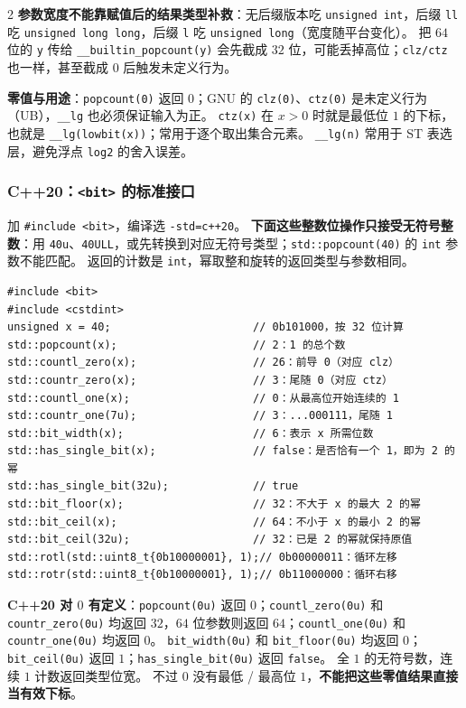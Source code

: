 \begin{multicols*}{2}
\textbf{参数宽度不能靠赋值后的结果类型补救}：无后缀版本吃 \texttt{unsigned int}，后缀 \texttt{ll} 吃 \texttt{unsigned long long}，后缀 \texttt{l} 吃 \texttt{unsigned long}（宽度随平台变化）。
把 $64$ 位的 \texttt{y} 传给 \texttt{\_\_builtin\_popcount(y)} 会先截成 $32$ 位，可能丢掉高位；\texttt{clz/ctz} 也一样，甚至截成 $0$ 后触发未定义行为。

\textbf{零值与用途}：\texttt{popcount(0)} 返回 $0$；GNU 的 \texttt{clz(0)}、\texttt{ctz(0)} 是未定义行为（UB），\texttt{\_\_lg} 也必须保证输入为正。
\texttt{ctz(x)} 在 $x>0$ 时就是最低位 $1$ 的下标，也就是 \texttt{\_\_lg(lowbit(x))}；常用于逐个取出集合元素。
\texttt{\_\_lg(n)} 常用于 ST 表选层，避免浮点 \texttt{log2} 的舍入误差。

\subsubsection{C++20：\texorpdfstring{\texttt{<bit>}}{<bit>} 的标准接口}

加 \texttt{\#include <bit>}，编译选 \texttt{-std=c++20}。
\textbf{下面这些整数位操作只接受无符号整数}：用 \texttt{40u}、\texttt{40ULL}，或先转换到对应无符号类型；\texttt{std::popcount(40)} 的 \texttt{int} 参数不能匹配。
返回的计数是 \texttt{int}，幂取整和旋转的返回类型与参数相同。

\begin{verbatim}
#include <bit>
#include <cstdint>
unsigned x = 40;                      // 0b101000，按 32 位计算
std::popcount(x);                     // 2：1 的总个数
std::countl_zero(x);                  // 26：前导 0（对应 clz）
std::countr_zero(x);                  // 3：尾随 0（对应 ctz）
std::countl_one(x);                   // 0：从最高位开始连续的 1
std::countr_one(7u);                  // 3：...000111，尾随 1
std::bit_width(x);                    // 6：表示 x 所需位数
std::has_single_bit(x);               // false：是否恰有一个 1，即为 2 的幂
std::has_single_bit(32u);             // true
std::bit_floor(x);                    // 32：不大于 x 的最大 2 的幂
std::bit_ceil(x);                     // 64：不小于 x 的最小 2 的幂
std::bit_ceil(32u);                   // 32：已是 2 的幂就保持原值
std::rotl(std::uint8_t{0b10000001}, 1);// 0b00000011：循环左移
std::rotr(std::uint8_t{0b10000001}, 1);// 0b11000000：循环右移
\end{verbatim}

\textbf{C++20 对 $0$ 有定义}：\texttt{popcount(0u)} 返回 $0$；\texttt{countl\_zero(0u)} 和 \texttt{countr\_zero(0u)} 均返回 $32$，$64$ 位参数则返回 $64$；\texttt{countl\_one(0u)} 和 \texttt{countr\_one(0u)} 均返回 $0$。
\texttt{bit\_width(0u)} 和 \texttt{bit\_floor(0u)} 均返回 $0$；\texttt{bit\_ceil(0u)} 返回 $1$；\texttt{has\_single\_bit(0u)} 返回 \texttt{false}。
全 $1$ 的无符号数，连续 $1$ 计数返回类型位宽。
不过 $0$ 没有最低 / 最高位 $1$，\textbf{不能把这些零值结果直接当有效下标}。


\end{multicols*}
